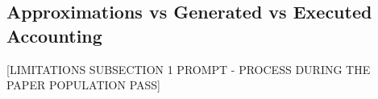
\subsection{Approximations vs Generated vs Executed Accounting}
\label{sec:limits-accounting}

[LIMITATIONS SUBSECTION 1 PROMPT - PROCESS DURING THE PAPER POPULATION PASS]

